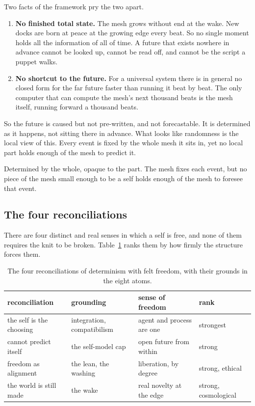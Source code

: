 Two facts of the framework pry the two apart.

\begin{enumerate}
\item \textbf{No finished total state.} The mesh grows without end at the wake. New docks are born at peace at the growing edge every beat. So no single moment holds all the information of all of time. A future that exists nowhere in advance cannot be looked up, cannot be read off, and cannot be the script a puppet walks.
\item \textbf{No shortcut to the future.} For a universal system there is in general no closed form for the far future faster than running it beat by beat. The only computer that can compute the mesh's next thousand beats is the mesh itself, running forward a thousand beats.
\end{enumerate}

So the future is caused but not pre-written, and not forecastable. It is determined as it happens, not sitting there in advance. What looks like randomness is the local view of this. Every event is fixed by the whole mesh it sits in, yet no local part holds enough of the mesh to predict it.

\begin{principle}
Determined by the whole, opaque to the part. The mesh fixes each event, but no piece of the mesh small enough to be a self holds enough of the mesh to foresee that event.
\end{principle}

\subsection{The four reconciliations}

There are four distinct and real senses in which a self is free, and none of them requires the knit to be broken. Table~\ref{tab:reconciliations} ranks them by how firmly the structure forces them.

\begin{table}[ht]
\centering
\begin{tabular}{@{}llll@{}}
\toprule
reconciliation & grounding & sense of freedom & rank \\
\midrule
the self is the choosing & integration, compatibilism & agent and process are one & strongest \\
cannot predict itself & the self-model cap & open future from within & strong \\
freedom as alignment & the lean, the washing & liberation, by degree & strong, ethical \\
the world is still made & the wake & real novelty at the edge & strong, cosmological \\
\bottomrule
\end{tabular}
\caption{The four reconciliations of determinism with felt freedom, with their grounds in the eight atoms.}
\label{tab:reconciliations}
\end{table}

